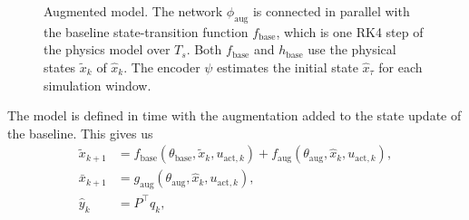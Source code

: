 \begin{figure}[t]
 \centering
 \resizebox{\columnwidth}{!}{}
 \caption{Augmented model. The network $\phi_{\mathrm{aug}}$ is connected in
 parallel with the baseline state-transition function $f_{\mathrm{base}}$,
 which is one RK4 step of the physics model over $T_s$.
 Both $f_{\mathrm{base}}$ and $h_{\mathrm{base}}$ use the physical
 states $\tilde x_k$ of $\hat x_k$.
 The encoder $\psi$ estimates the initial state $\hat x_\tau$
 for each simulation window.
 }%
 \label{fig:aug_structure}
\end{figure}
%
The model is defined in  time with the augmentation added to
the state update of the baseline.
This gives us
\begin{equation}
\begin{aligned}
 \tilde x_{k+1}
 &=f_{\mathrm{base}}(\theta_{\mathrm{base}},\tilde x_k,u_{\mathrm{act},k})
   +f_{\mathrm{aug}}(\theta_{\mathrm{aug}},\hat x_k,u_{\mathrm{act},k}),\\
 \bar x_{k+1}
 &=g_{\mathrm{aug}}(\theta_{\mathrm{aug}},\hat x_k,u_{\mathrm{act},k}),\\
 \hat y_k&=P^\top q_k,
\end{aligned}
\label{eq:aug_transition}
\end{equation}
